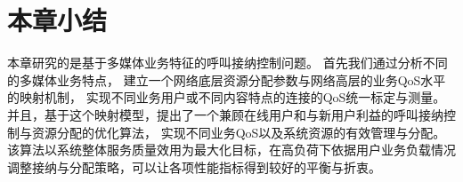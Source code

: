 \section{本章小结}
本章研究的是基于多媒体业务特征的呼叫接纳控制问题。
首先我们通过分析不同的多媒体业务特点，
建立一个网络底层资源分配参数与网络高层的业务QoS水平的映射机制，
实现不同业务用户或不同内容特点的连接的QoS统一标定与测量。 
并且，基于这个映射模型，提出了一个兼顾在线用户和与新用户利益的呼叫接纳控制与资源分配的优化算法，
实现不同业务QoS以及系统资源的有效管理与分配。
该算法以系统整体服务质量效用为最大化目标，在高负荷下依据用户业务负载情况调整接纳与分配策略，可以让各项性能指标得到较好的平衡与折衷。
%


